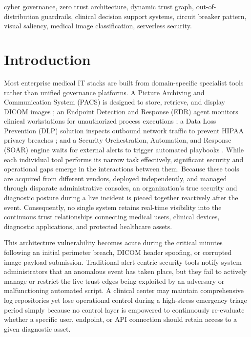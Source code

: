 \documentclass[conference]{IEEEtran}
\begin{document}
\begin{IEEEkeywords}
cyber governance, zero trust architecture, dynamic trust graph, out-of-distribution guardrails, clinical decision support systems, circuit breaker pattern, visual saliency, medical image classification, serverless security.
\end{IEEEkeywords}

\section{Introduction}
Most enterprise medical IT stacks are built from domain-specific specialist tools rather than unified governance platforms. A Picture Archiving and Communication System (PACS) is designed to store, retrieve, and display DICOM images \cite{gonzalez2021}; an Endpoint Detection and Response (EDR) agent monitors clinical workstations for unauthorized process executions \cite{kaur2024}; a Data Loss Prevention (DLP) solution inspects outbound network traffic to prevent HIPAA privacy breaches \cite{alneyadi2016}; and a Security Orchestration, Automation, and Response (SOAR) engine waits for external alerts to trigger automated playbooks \cite{bartwal2022}. While each individual tool performs its narrow task effectively, significant security and operational gaps emerge in the interactions between them. Because these tools are acquired from different vendors, deployed independently, and managed through disparate administrative consoles, an organization's true security and diagnostic posture during a live incident is pieced together reactively after the event. Consequently, no single system retains real-time visibility into the continuous trust relationships connecting medical users, clinical devices, diagnostic applications, and protected healthcare assets.

This architecture vulnerability becomes acute during the critical minutes following an initial perimeter breach, DICOM header spoofing, or corrupted image payload submission. Traditional alert-centric security tools notify system administrators that an anomalous event has taken place, but they fail to actively manage or restrict the live trust edges being exploited by an adversary or malfunctioning automated script. A clinical center may maintain comprehensive log repositories yet lose operational control during a high-stress emergency triage period simply because no control layer is empowered to continuously re-evaluate whether a specific user, endpoint, or API connection should retain access to a given diagnostic asset.
\end{document}
